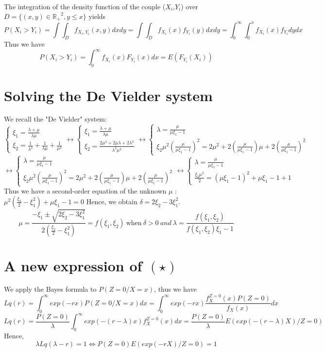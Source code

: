 \documentclass[12pt,twoside]{article}
\begin{document}
{The  integration of the density function of the couple ($X_i$,$Y_i$) over $D= \{(x,y)\in \mathbb{R_+}^2,y\leq x\}$ yields
$$
P(X_i>Y_i)=\int \int_D f_{X_i,Y_i}(x,y) dx dy = \int \int_D f_{X_i}(x) f_{Y_i}(y) dx dy = \int_0^{\infty} \int_0^x f_{X_i}(x) f_{Y_i}dy dx
$$
Thus we have
$$
P(X_i>Y_i) = \int_0^{\infty} f_{X_i}(x) F_{Y_i}(x) dx = E(F_{Y_i}(X_i))
$$

\section{Solving the De Vielder system}
\label{DV}
We recall the "De Vielder" system:
$$
\left\{
\begin{array}{c}
\xi_1=\frac{\lambda+\mu}{\lambda \mu}\\
\xi_2=\frac{1}{\lambda^2}+\frac{1}{\lambda \mu}+ \frac{1}{\mu^2}
\end{array}
\right.
\leftrightarrow
\left\{
\begin{array}{c}
\xi_1=\frac{\lambda+\mu}{\lambda \mu}\\
\xi_2=\frac{2\mu^2+2\mu\lambda+2\lambda^2}{\lambda^2\mu^2}
\end{array}
\right.
\leftrightarrow
\left\{
\begin{array}{c}
\lambda=\frac{\mu}{\mu\xi_1-1}\\
\xi_2 \mu^2 (\frac{\mu}{\mu\xi_1-1})^2 = 2\mu^2+2(\frac{\mu}{\mu\xi_1-1})\mu+2(\frac{\mu}{\mu\xi_1-1})^2
\end{array}
\right.
$$
$$
\leftrightarrow
\left\{
\begin{array}{c}
\lambda=\frac{\mu}{\mu\xi_1-1}\\
\xi_2 \mu^2 (\frac{\mu}{\mu\xi_1-1})^2 = 2\mu^2+2(\frac{\mu}{\mu\xi_1-1})\mu+2(\frac{\mu}{\mu\xi_1-1})^2
\end{array}
\right.
\leftrightarrow
\left\{
\begin{array}{c}
\lambda=\frac{\mu}{\mu\xi_1-1}\\
\frac{\xi_2\mu^2}{2} = (\mu\xi_1-1)^2 + \mu\xi_1-1+1
\end{array}
\right.
$$
Thus we have a second-order equation of the unknown $\mu$ :
$
\mu^2(\frac{\xi_2}{2}-\xi_1^2)+\mu\xi_1-1=0
$
Hence, we obtain $\delta = 2\xi_2-3\xi_1^2$.
$$
\mu=\frac{-\xi_1 \pm \sqrt{2\xi_2-3\xi_1^2}}{2(\frac{\xi_2}{2}-\xi_1^2)}=f(\xi_1,\xi_2)~ \textrm{when} ~\delta>0~ and ~
\lambda=\frac{f(\xi_1,\xi_2)}{f(\xi_1,\xi_2)\xi_1-1}
$$ 




\section{A new expression of $(\star)$ }
\label{mod1_non_param}

We apply the Bayes formula to $P(Z=0/X=x)$, thus we have
$$
Lq(r) = \int_0^{\infty} exp(-r x )P(Z=0/X=x)dx = \int_0^{\infty} exp(-r x )\frac{f_X^{Z=0}(x) P(Z=0)}{f_X(x)} dx
$$
$$
Lq(r)		= \frac{P(Z=0)}{\lambda}\int_0^{\infty} exp(-(r-\lambda) x )f_X^{Z=0}(x) dx= \frac{P(Z=0)}{\lambda}E(exp(-(r-\lambda) X)/Z=0)
$$
Hence,
$$
\lambda Lq(\lambda - r) = 1 \Leftrightarrow P(Z=0)E(exp(-r X)/Z=0) = 1
$$


} %
\end{document}
